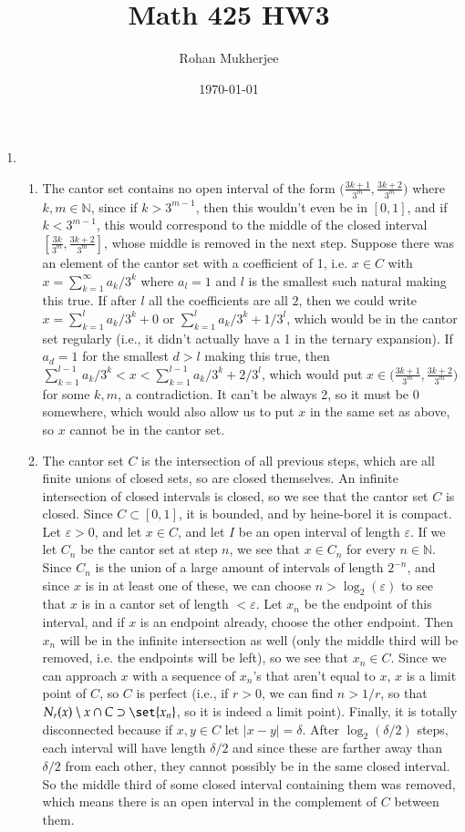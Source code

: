 \documentclass[12pt]{article}
\title{Math 425 HW3}
\date{\today}
\author{Rohan Mukherjee}
\def\mbb#1{\mathbb{#1}}
\def\bN{\mbb{N}}
\def \ve{\varepsilon}
\theoremstyle{definition}
\theoremstyle{remark}
\begin{document}
	\maketitle
	\begin{enumerate}[leftmargin=\labelsep]
		\item \begin{enumerate}
			\item The cantor set contains no open interval of the form $\big(\frac{3k+1}{3^m}, \frac{3k+2}{3^m}\big)$ where $k, m \in \bN$, since if $k > 3^{m-1}$, then this wouldn't even be in $[0, 1]$, and if $k < 3^{m-1}$, this would correspond to the middle of the closed interval $[\frac{3k}{3^m}, \frac{3k+2}{3^m}]$, whose middle is removed in the next step. Suppose there was an element of the cantor set with a coefficient of 1, i.e. $x \in C$ with $x = \sum_{k=1}^{\infty} a_k/3^k$ where $a_l = 1$ and $l$ is the smallest such natural making this true. If after $l$ all the coefficients are all $2$, then we could write $x = \sum_{k=1}^{l} a_k/3^k + 0$ or $\sum_{k=1}^{l} a_k/3^k + 1/3^l$, which would be in the cantor set regularly (i.e., it didn't actually have a 1 in the ternary expansion). If $a_{d} = 1$ for the smallest $d > l$ making this true, then $\sum_{k=1}^{l-1} a_k/3^k < x < \sum_{k=1}^{l-1} a_k/3^k+2/3^l$, which would put $x \in \big(\frac{3k+1}{3^m}, \frac{3k+2}{3^m}\big)$ for some $k, m$, a contradiction. It can't be always 2, so it must be 0 somewhere, which would also allow us to put $x$ in the same set as above, so $x$ cannot be in the cantor set. 
			\item The cantor set $C$ is the intersection of all previous steps, which are all finite unions of closed sets, so are closed themselves. An infinite intersection of closed intervals is closed, so we see that the cantor set $C$ is closed. Since $C \subset [0, 1]$, it is bounded, and by heine-borel it is compact. Let $\ve>0$, and let $x \in C$, and let $I$ be an open interval of length $\ve$. If we let $C_n$ be the cantor set at step $n$, we see that $x \in C_n$ for every $n \in \bN$. Since $C_n$ is the union of a large amount of intervals of length $2^{-n}$, and since $x$ is in at least one of these, we can choose $n > \log_2(\ve)$ to see that $x$ is in a cantor set of length $< \ve$. Let $x_n$ be the endpoint of this interval, and if $x$ is an endpoint already, choose the other endpoint. Then $x_n$ will be in the infinite intersection as well (only the middle third will be removed, i.e. the endpoints will be left), so we see that $x_n \in C$. Since we can approach $x$ with a sequence of $x_n$'s that aren't equal to $x$, $x$ is a limit point of $C$, so $C$ is perfect (i.e., if $r > 0$, we can find $n > 1/r$, so that $N_r(x) \setminus x \cap C \supset \set{x_n}$, so it is indeed a limit point). Finally, it is totally disconnected because if $x, y \in C$ let $|x-y| = \delta$. After $\log_2(\delta/2)$ steps, each interval will have length $\delta/2$ and since these are farther away than $\delta/2$ from each other, they cannot possibly be in the same closed interval. So the middle third of some closed interval containing them was removed, which means there is an open interval in the complement of $C$ between them.
		\end{enumerate}
		

\end{enumerate}
\end{document}
